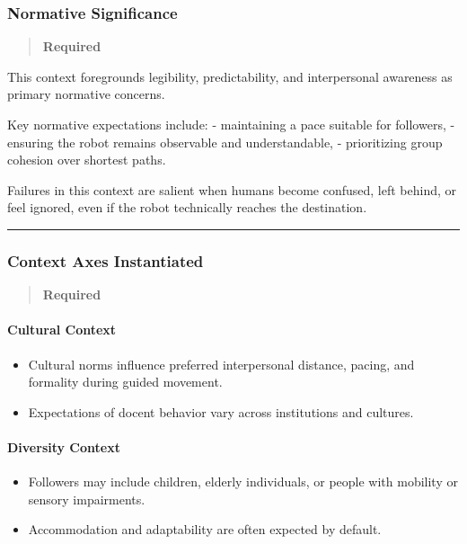 \documentclass[utf8]{frontiers_suppmat} %
\providecommand{\tightlist}{%
  \setlength{\itemsep}{0pt}\setlength{\parskip}{0pt}}
\begin{document}
\subsubsection{Normative Significance}\label{normative-significance}

\begin{quote}
\textbf{Required}
\end{quote}

This context foregrounds legibility, predictability, and interpersonal
awareness as primary normative concerns.

Key normative expectations include: - maintaining a pace suitable for
followers, - ensuring the robot remains observable and understandable, -
prioritizing group cohesion over shortest paths.

Failures in this context are salient when humans become confused, left
behind, or feel ignored, even if the robot technically reaches the
destination.

\begin{center}\rule{0.5\linewidth}{0.5pt}\end{center}

\subsubsection{Context Axes
Instantiated}\label{context-axes-instantiated}

\begin{quote}
\textbf{Required}
\end{quote}

\paragraph{Cultural Context}\label{cultural-context}

\begin{itemize}
\tightlist
\item
  Cultural norms influence preferred interpersonal distance, pacing, and
  formality during guided movement.
\item
  Expectations of docent behavior vary across institutions and cultures.
\end{itemize}

\paragraph{Diversity Context}\label{diversity-context}

\begin{itemize}
\tightlist
\item
  Followers may include children, elderly individuals, or people with
  mobility or sensory impairments.
\item
  Accommodation and adaptability are often expected by default.
\end{itemize}
\end{document}
